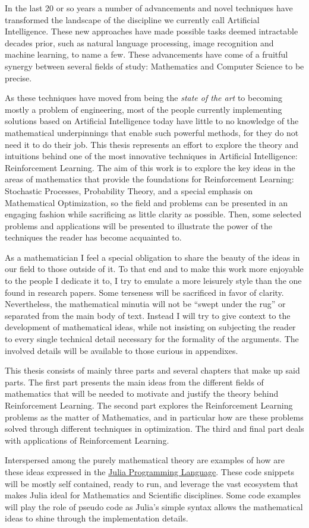 In the last 20 or so years a number of advancements and novel 
techniques have transformed the landscape of the discipline we 
currently call Artificial Intelligence. These new approaches have made 
possible tasks deemed intractable decades prior, such as natural 
language processing, image recognition and machine learning, to name a 
few. These advancements have come of a fruitful synergy between 
several fields of study: Mathematics and Computer Science to be 
precise.

As these techniques have moved from being the \textit{state of the 
art} to becoming mostly a problem of engineering, most of the people 
currently implementing solutions based on Artificial Intelligence 
today have little to no knowledge of the mathematical underpinnings 
that enable such powerful methods, for they do not need it to do their 
job.  This thesis represents an effort to explore the theory and 
intuitions behind one of the most innovative techniques in Artificial 
Intelligence: Reinforcement Learning. The aim of this work is to 
explore the key ideas in the areas of mathematics that provide the 
foundations for Reinforcement Learning: Stochastic Processes, 
Probability Theory, and a special emphasis on Mathematical 
Optimization, so the field and problems can be presented in an 
engaging fashion while sacrificing as little clarity as possible.  
Then, some selected problems and applications will be presented to 
illustrate the power of the techniques the reader has become 
acquainted to. 

As a mathematician I feel a special obligation to share the beauty of 
the ideas in our field to those outside of it. To that end and to make 
this work more enjoyable to the people I dedicate it to, I try to 
emulate a more leisurely style than the one found in research papers.  
Some terseness will be sacrificed in favor of clarity. Nevertheless, 
the mathematical minutia will not be ``swept under the rug'' or 
separated from the main body of text. Instead I will try to give 
context to the development of mathematical ideas, while not insisting 
on subjecting the reader to every single technical detail necessary 
for the formality of the arguments. The involved details will be 
available to those curious in appendixes.

This thesis consists of mainly three parts and several chapters that 
make up said parts. The first part presents the main ideas from the 
different fields of mathematics that will be needed to motivate and 
justify the theory behind Reinforcement Learning. The second part 
explores the Reinforcement Learning problems as the matter of 
Mathematics, and in particular how are these problems solved through 
different techniques in optimization. The third and final part deals 
with applications of Reinforcement Learning.

Interspersed among the purely mathematical theory are examples of how 
are these ideas expressed in the \href{https://julialang.org/}{Julia 
Programming Language}. These code snippets will be mostly self 
contained, ready to run, and leverage the vast ecosystem that makes 
Julia ideal for Mathematics and Scientific disciplines. Some code 
examples will play the role of pseudo code as Julia's simple syntax 
allows the mathematical ideas to shine through the implementation 
details.
